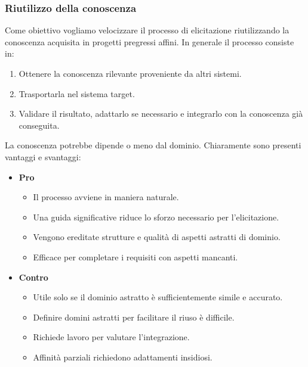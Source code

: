 \documentclass[../main.tex]{subfiles}
\begin{document}
\subsubsection{Riutilizzo della conoscenza}
Come obiettivo vogliamo velocizzare il processo di elicitazione riutilizzando la conoscenza acquisita in progetti pregressi affini.
In generale il processo consiste in:
\begin{enumerate}
	\item Ottenere la conoscenza rilevante proveniente da altri sistemi.
	\item Trasportarla nel sistema target.
	\item Validare il risultato, adattarlo se necessario e integrarlo con la conoscenza già conseguita. 
\end{enumerate}
La conoscenza potrebbe dipende o meno dal dominio. Chiaramente sono presenti vantaggi e svantaggi:
\begin{itemize}
	\item \textbf{Pro}
	\begin{itemize}
		\item Il processo avviene in maniera naturale.
		\item Una guida significative riduce lo sforzo necessario per l'elicitazione.
		\item Vengono ereditate strutture e qualità di aspetti astratti di dominio.
		\item Efficace per completare i requisiti con aspetti mancanti.
	\end{itemize}
	\item \textbf{Contro}
	\begin{itemize}
		\item Utile solo se il dominio astratto è sufficientemente simile e accurato.
		\item Definire domini astratti per facilitare il riuso è difficile.
		\item Richiede lavoro per valutare l'integrazione.
		\item Affinità parziali richiedono adattamenti insidiosi.
	\end{itemize}
\end{itemize}
\end{document}
